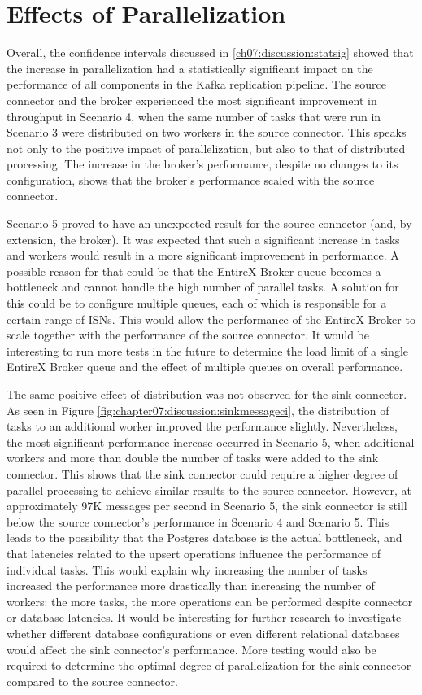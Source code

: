 \section{Effects of Parallelization}
Overall, the confidence intervals discussed in \ref{ch07:discussion:statsig} showed that the increase in parallelization had a statistically significant impact on the performance of all components in the Kafka replication pipeline. The source connector and the broker experienced the most significant improvement in throughput in Scenario 4, when the same number of tasks that were run in Scenario 3 were distributed on two workers in the source connector. This speaks not only to the positive impact of parallelization, but also to that of distributed processing. The increase in the broker's performance, despite no changes to its configuration, shows that the broker's performance scaled with the source connector. %

Scenario 5 proved to have an unexpected result for the source connector (and, by extension, the broker). It was expected that such a significant increase in tasks and workers would result in a more significant improvement in performance. A possible reason for that could be that the EntireX Broker queue becomes a bottleneck and cannot handle the high number of parallel tasks. A solution for this could be to configure multiple queues, each of which is responsible for a certain range of \ac{ISN}s. This would allow the performance of the EntireX Broker to scale together with the performance of the source connector. It would be interesting to run more tests in the future to determine the load limit of a single EntireX Broker queue and the effect of multiple queues on overall performance.

The same positive effect of distribution was not observed for the sink connector. As seen in Figure \ref{fig:chapter07:discussion:sinkmessageci}, the distribution of tasks to an additional worker improved the performance slightly. Nevertheless, the most significant performance increase occurred in Scenario 5, when additional workers and more than double the number of tasks were added to the sink connector. This shows that the sink connector could require a higher degree of parallel processing to achieve similar results to the source connector. However, at approximately 97K messages per second in Scenario 5, the sink connector is still below the source connector's performance in Scenario 4 and Scenario 5. This leads to the possibility that the Postgres database is the actual bottleneck, and that latencies related to the upsert operations influence the performance of individual tasks. This would explain why increasing the number of tasks increased the performance more drastically than increasing the number of workers: the more tasks, the more operations can be performed despite connector or database latencies. It would be interesting for further research to investigate whether different database configurations or even different relational databases would affect the sink connector's performance. More testing would also be required to determine the optimal degree of parallelization for the sink connector compared to the source connector.


